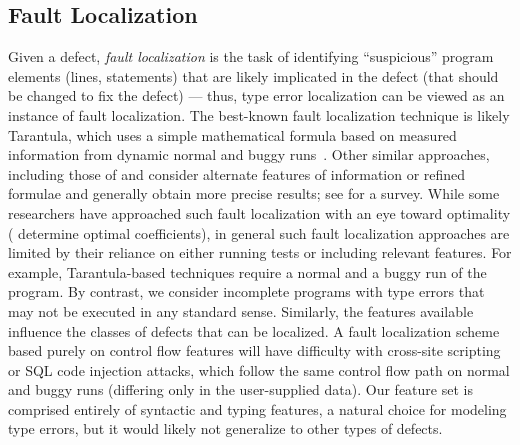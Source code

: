 \subsection{Fault Localization}
Given a defect, \emph{fault localization} is the task of identifying
``suspicious'' program elements (\eg lines, statements) that are likely
implicated in the defect (\ie that should be changed to fix the defect)
%
--- thus, type error localization can be viewed as an instance of fault
localization.
%
The best-known fault localization technique is likely Tarantula, which
uses a simple mathematical formula based on measured information from
dynamic normal and buggy runs~\citep{Jones2002-us}.
%
Other similar approaches, including those of \citet{Chen2002-qz} and
\citet{Abreu2006-fn,Abreu2007-mu} consider alternate features of
information or refined formulae and generally obtain more precise
results; see \citet{Wong2009-pd} for a survey.
%
While some researchers have approached such fault localization with an
eye toward optimality (\eg \citet{Yoo2013-rw} determine optimal
coefficients), in general such fault localization approaches are limited
by their reliance on either running tests or including relevant
features.
%
For example, Tarantula-based techniques require a normal and a buggy run
of the program.
%
By contrast, we consider incomplete programs with type errors that may
not be executed in any standard sense.
%
Similarly, the features available influence the classes of defects that
can be localized.
%
A fault localization scheme based purely on control flow features
will have difficulty with cross-site scripting or SQL code injection
attacks, which follow the same control flow path on normal and buggy
runs (differing only in the user-supplied data).
%
Our feature set is comprised entirely of syntactic and typing features,
a natural choice for modeling type errors, but it would likely not
generalize to other types of defects.





